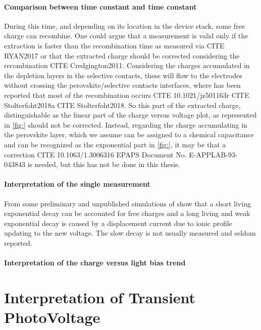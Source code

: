 \paragraph{Comparison between  time constant and  time constant}
During this time, and depending on its location in the device stack, some free charge can recombine. One could argue that a  measurement is valid only if the extraction is faster than the recombination time as measured via CITE RYAN2017 or that the extracted charge should be corrected considering the recombination CITE Credgington2011. Considering the charges accumulated in the depletion layers in the selective contacts, these will flow to the electrodes without crossing the perovskite/selective contacts interfaces, where has been reported that most of the recombination occurs CITE 10.1021/jz501163r CITE Stolterfoht2018a CITE Stolterfoht2018. So this part of the extracted charge, distinguishable as the linear part of the charge versus voltage plot, as represented in \cref{fig:} should not be corrected. Instead, regarding the charge accumulating in the perovskite layer, which we assume can be assigned to a chemical capacitance and can be recognized as the exponential part in \cref{fig:}, it may be that a correction CITE 10.1063/1.3006316 EPAPS Document No. E-APPLAB-93-043843 is needed, but this has not be done in this thesis.

\paragraph{Interpretation of the single measurement}
From some preliminary and unpublished simulations of  show that a short living exponential decay can be accounted for free charges and a long living and weak exponential decay is caused by a displacement current due to ionic profile updating to the new voltage. The slow decay is not usually measured and seldom reported\cite{ORegan2015b}.

\paragraph{Interpretation of the charge versus light bias trend}


\section{Interpretation of Transient PhotoVoltage}\label{interpretation_tpv}

